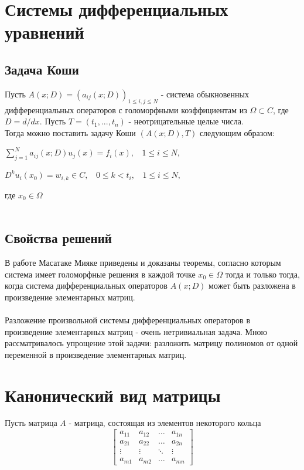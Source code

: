 \documentclass[14pt, a4paper]{extreport}
\begin{document}
\chapter{Системы дифференциальных уравнений}
	\section{Задача Коши}
	Пусть $A(x;D) = (a_{ij}(x;D))_{1 \leq i, j \leq N}$ - система обыкновенных
	дифференциальных операторов с голоморфными коэффициентам из $\Omega \subset C$,
	где $D = d/dx$. Пусть $T = (t_1,...,t_n)$ - неотрицательные целые числа. \\
	Тогда можно поставить задачу Коши $(A(x;D), T)$ следующим образом:
	\begin{center}
		$\sum\limits_{j=1}^N a_{ij}(x;D)u_j(x) = f_i(x), \ \ \ \ 1 \leq i \leq N,$
	\end{center}
	\begin{center}
		$D^ku_i(x_0) = w_{i, k} \in C,\ \ \ \ 0 \leq k < t_i, \ \ \ \ 1 \leq i \leq N, $
	\end{center}
	где $x_0 \in \Omega$\\\\
	\section{Свойства решений}
	В работе \cite{miyake} Масатаке Мияке приведены и доказаны теоремы, согласно которым система
	имеет голоморфные решения в каждой точке $x_0 \in \Omega$ тогда и только тогда,
	когда система дифференциальных операторов $A(x;D)$ может быть разложена
	в произведение элементарных матриц. \\\\
	Разложение произвольной системы дифференциальных операторов в произведение
	элементарных матриц - очень нетривиальная задача. Мною рассматривалось упрощение
	этой задачи: разложить матрицу полиномов от одной переменной в произведение
	элементарных матриц.
\newpage
\chapter{Канонический вид матрицы}
	Пусть матрица $A$ - матрица, состоящая из элементов некоторого кольца
	\[
		\begin{bmatrix}
			a_{11} & a_{12} & \dots & a_{1n} \\
			a_{21} & a_{22} & \dots & a_{2n} \\
			\vdots & \vdots & \ddots & \vdots \\
			a_{m1} & a_{m2} & \dots & a_{mn}
		\end{bmatrix}
	\]
\end{document}

